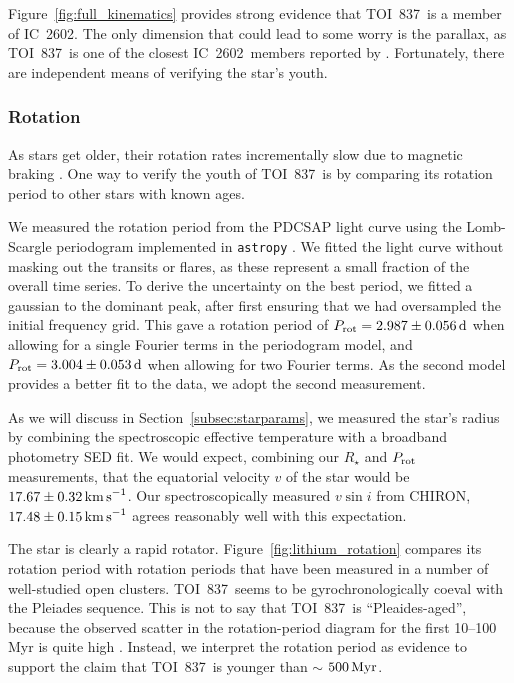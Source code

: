 \documentclass[12pt,twocolumn,tighten]{aastex63}
\newcommand{\tn}{TOI~837} %
\newcommand{\cn}{IC~2602} %
\begin{document}
Figure~\ref{fig:full_kinematics} provides strong evidence that \tn\ is
a member of \cn.  The only dimension that could lead to some worry is
the parallax, as \tn\ is one of the closest \cn\ members reported by
\citet{cantatgaudin_gaia_2018}.  Fortunately, there are independent
means of verifying the star's youth.

\subsubsection{Rotation}

As stars get older, their rotation rates incrementally slow due to
magnetic braking \cite{weber_angular_1967,skumanich_time_1972}.  One
way to verify the youth of \tn\ is by comparing its rotation period to
other stars with known ages.

We measured the rotation period from the PDCSAP light curve using the
Lomb-Scargle periodogram implemented in \texttt{astropy}
\citep{lomb_1976,scargle_studies_1982,vanderplas_periodograms_2015}.
We fitted the light curve without masking out the transits or flares,
as these represent a small fraction of the overall time series.  To
derive the uncertainty on the best period, we fitted a gaussian to the
dominant peak, after first ensuring that we had oversampled the
initial frequency grid.  This gave a rotation period of $P_{\rm rot} =
2.987 \pm 0.056\,{\rm d}$ when allowing for a single Fourier terms in
the periodogram model, and $P_{\rm rot} = 3.004 \pm 0.053\,{\rm d}$
when allowing for two Fourier terms.  As the second model provides a
better fit to the data, we adopt the second measurement.

As we will discuss in Section~\ref{subsec:starparams}, we measured the
star's radius by combining the spectroscopic effective temperature
with a broadband photometry SED fit.  We would expect, combining our
$R_\star$ and $P_{\rm rot}$ measurements, that the equatorial velocity
$v$ of the star would be $17.67 \pm 0.32 \,{\rm km\,s}^{-1}$.  Our
spectroscopically measured $v\sin i$ from CHIRON, $17.48 \pm 0.15
\,{\rm km\,s}^{-1}$ agrees reasonably well with this expectation.

The star is clearly a rapid rotator.
Figure~\ref{fig:lithium_rotation} compares its rotation period with
rotation periods that have been measured in a number of well-studied
open clusters.  \tn\ seems to be gyrochronologically coeval with the
Pleiades sequence.  This is not to say that \tn\ is ``Pleaides-aged'',
because the observed scatter in the rotation-period diagram for the
first 10--100$\,$Myr is quite high \citep[see Figure~9
of][]{rebull_rotation_2020}.  Instead, we interpret the rotation
period as evidence to support the claim that \tn\ is younger than
$\sim$ $500\,{\rm Myr}$.
\end{document}

